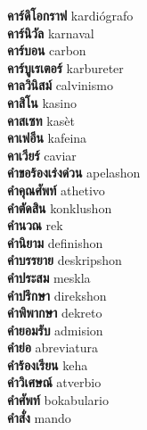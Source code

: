 \textbf{ คาร์ดิโอกราฟ  } kardiógrafo \\
\textbf{ คาร์นิวัล  } karnaval \\
\textbf{ คาร์บอน  } carbon \\
\textbf{ คาร์บูเรเตอร์  } karbureter \\
\textbf{ คาลวินิสม์  } calvinismo \\
\textbf{ คาสิโน  } kasino \\
\textbf{ คาสเซท  } kasèt \\
\textbf{ คาเฟอีน  } kafeina \\
\textbf{ คาเวียร์  } caviar \\
\textbf{ คำขอร้องเร่งด่วน  } apelashon \\
\textbf{ คำคุณศัพท์  } athetivo \\
\textbf{ คำตัดสิน  } konklushon \\
\textbf{ คำนวณ  } rek \\
\textbf{ คำนิยาม  } definishon \\
\textbf{ คำบรรยาย  } deskripshon \\
\textbf{ คำประสม  } meskla \\
\textbf{ คำปรึกษา  } direkshon \\
\textbf{ คำพิพากษา  } dekreto \\
\textbf{ คำยอมรับ  } admision \\
\textbf{ คำย่อ  } abreviatura \\
\textbf{ คำร้องเรียน  } keha \\
\textbf{ คำวิเศษณ์  } atverbio \\
\textbf{ คำศัพท์  } bokabulario \\
\textbf{ คำสั่ง  } mando \\
